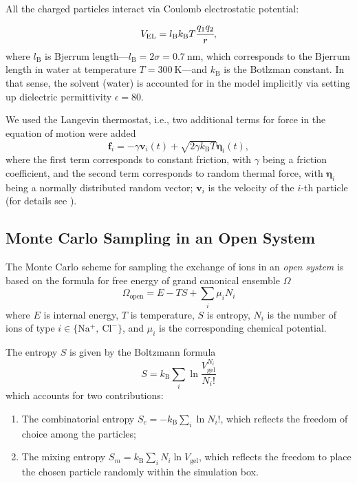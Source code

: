 \documentclass[gels,article,accept,pdftex,moreauthors]{Definitions/mdpi}
\newcommand{\ie}{{i.e.,} }
\newcommand{\kT}{k_\mathrm{B}T}
\newcommand{\kB}{k_\mathrm{B}}
\newcommand{\lb}{l_\mathrm{B}}
\newcommand{\cl}{\mathrm{Cl^-}}
\newcommand{\na}{\mathrm{Na^+}}
\newcommand{\Vgel}{V_\mathrm{gel}}
\begin{document}
All the charged particles interact via Coulomb electrostatic potential:
\begin{equation}
    V_{\mathrm{EL}}=\lb\kT \cfrac{q_{1}q_{2}}{r},
\end{equation}
where $\lb$ is Bjerrum length---$\lb = 2\sigma = 0.7~\mathrm{nm}$, which corresponds to the  Bjerrum length in water at temperature $T=300~\mathrm{K}$---and $\kB$ is the Botlzman constant.
In that sense, the solvent (water) is accounted for in the model implicitly via setting up dielectric permittivity $\epsilon=80$.

We used the Langevin thermostat, \ie two additional terms for force in the equation of motion were added
\begin{equation}
\mathbf{f}_i =  -\gamma \mathbf{v}_i(t)+\sqrt{2\gamma \kT }\boldsymbol{\eta}_i(t),
\end{equation}
where the first term corresponds to constant friction, with $\gamma$ being a friction coefficient,
 and the second term corresponds to random thermal force, with $\boldsymbol{\eta}_i$ being a normally distributed random vector; $\mathbf{v}_i$ is the velocity of the $i$-th particle (for details see \cite{Grest1986}).

\subsection{Monte Carlo Sampling in an Open System}
The Monte Carlo scheme for sampling the exchange of ions in an \emph{open system} is based on the formula for free energy of grand canonical ensemble $\Omega$
\begin{equation}
    \Omega_{\mathrm{open}}=E-TS+\sum_i\mu_i N_i\label{eq:Omega-GC}
\end{equation}
where $E$ is internal energy, $T$ is temperature, $S$ is entropy, $N_i$ is the number of ions of type $i\in\{\na,\ \cl\}$, and $\mu_i$ is the corresponding chemical potential.

The entropy $S$ is given by the Boltzmann formula~\cite{Nagle2004}
\begin{equation}
    S=\kB\sum_i\ln\frac{\Vgel^{N_i}}{N_i!}\label{eq:entropy}
\end{equation}
which accounts for two contributions:
\begin{enumerate}
    \item The combinatorial entropy $S_{c}=-\kB\sum_i\ln N_i!$, which reflects the freedom of choice among the particles;
    \item The mixing entropy $S_{m}=\kB \sum_i N_i\ln \Vgel$, which reflects the freedom to place the chosen particle randomly within the simulation box. 
\end{enumerate}
\end{document}
